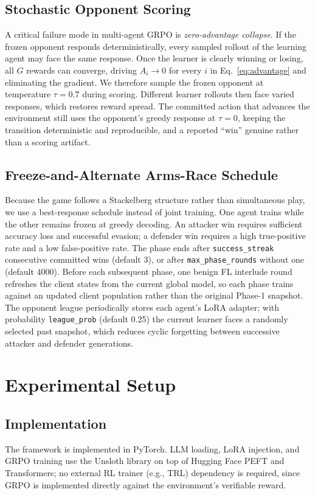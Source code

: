 \documentclass[conference]{IEEEtran}
\begin{document}
\subsection{Stochastic Opponent Scoring}
\label{sec:opponent-scoring}
A critical failure mode in multi-agent GRPO is \emph{zero-advantage collapse}. If the frozen opponent responds deterministically, every sampled rollout of the learning agent may face the same response. Once the learner is clearly winning or losing, all $G$ rewards can converge, driving $A_i \to 0$ for every $i$ in Eq.~\eqref{eq:advantage} and eliminating the gradient. We therefore sample the frozen opponent at temperature $\tau=0.7$ during scoring. Different learner rollouts then face varied responses, which restores reward spread. The committed action that advances the environment still uses the opponent's greedy response at $\tau=0$, keeping the transition deterministic and reproducible, and a reported ``win'' genuine rather than a scoring artifact.

\subsection{Freeze-and-Alternate Arms-Race Schedule}
Because the game follows a Stackelberg structure rather than simultaneous play, we use a best-response schedule instead of joint training. One agent trains while the other remains frozen at greedy decoding. An attacker win requires sufficient accuracy loss and successful evasion; a defender win requires a high true-positive rate and a low false-positive rate. The phase ends after \texttt{success\_streak} consecutive committed wins (default 3), or after \texttt{max\_phase\_rounds} without one (default 4000). Before each subsequent phase, one benign FL interlude round refreshes the client states from the current global model, so each phase trains against an updated client population rather than the original Phase-1 snapshot. The opponent league periodically stores each agent's LoRA adapter; with probability \texttt{league\_prob} (default 0.25) the current learner faces a randomly selected past snapshot, which reduces cyclic forgetting between successive attacker and defender generations.

\section{Experimental Setup}
\label{sec:setup}

\subsection{Implementation}
The framework is implemented in PyTorch. LLM loading, LoRA injection, and GRPO training use the Unsloth library on top of Hugging Face PEFT and Transformers; no external RL trainer (e.g., TRL) dependency is required, since GRPO is implemented directly against the environment's verifiable reward.
\end{document}
